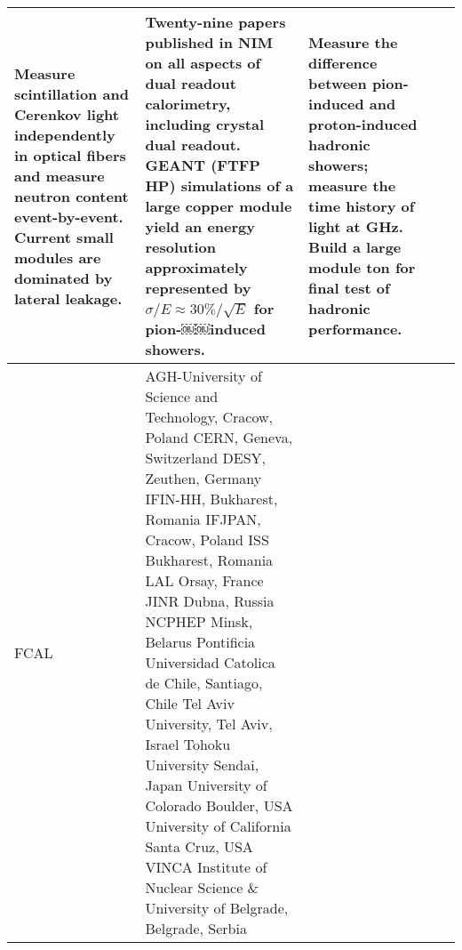\begin{landscape}
\begin{sidewaystable}
\begin{adjustbox}{max width=1.1\textwidth,totalheight=1\textheight}
\begin{tabularx}{2\textheight}{lXXXX}
     Measure scintillation and Cerenkov light independently in optical fibers and measure neutron content event-by-event. Current small modules are dominated by lateral leakage. &
     Twenty-nine papers published in NIM on all aspects of dual readout calorimetry, including crystal dual readout. GEANT (FTFP HP) simulations of a large copper module yield an energy resolution approximately represented by $\sigma/E \approx 30\%/\sqrt{E}$ for pion-￼￼induced showers. &
     Measure the difference between pion-induced and proton-induced hadronic showers; measure the time history of light at \unit[5]{GHz}. Build a large module \unit[4]{ton} for final test of hadronic performance. \\
     \midrule
     FCAL &
     AGH-University of Science and Technology, Cracow, Poland \newline
CERN, Geneva, Switzerland  \newline
DESY, Zeuthen, Germany  \newline
IFIN-HH, Bukharest, Romania  \newline
IFJPAN, Cracow, Poland  \newline
ISS Bukharest, Romania  \newline
LAL Orsay, France  \newline
JINR Dubna, Russia  \newline
NCPHEP Minsk, Belarus  \newline
Pontificia Universidad Catolica de Chile, Santiago, Chile \newline
Tel Aviv University, Tel Aviv, Israel  \newline
Tohoku University Sendai, Japan  \newline
University of Colorado Boulder, USA  \newline
University of California Santa Cruz, USA  \newline
VINCA Institute of Nuclear Science \& University of Belgrade, Belgrade, Serbia  &
&
& \\
    \bottomrule
\end{tabularx}
\end{adjustbox}
\end{sidewaystable}
\end{landscape}
\restoregeometry
